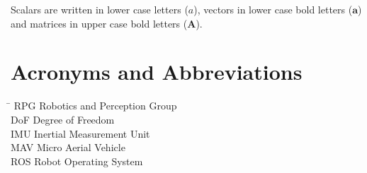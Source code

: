 Scalars are written in lower case letters ($a$), vectors in lower case bold letters ($\mathbf{a}$) and matrices in upper case bold letters ($\mathbf{A}$).

\section*{Acronyms and Abbreviations}
  \begin{tabbing}
    \hspace*{1.6cm}  \= \kill
    RPG     \> Robotics and Perception Group \\[0.5ex]
    DoF     \> Degree of Freedom \\[0.5ex]
    IMU     \> Inertial Measurement Unit \\[0.5ex]
    MAV     \> Micro Aerial Vehicle \\[0.5ex]
    ROS     \> Robot Operating System \\[0.5ex]
  \end{tabbing}

\clearpage

